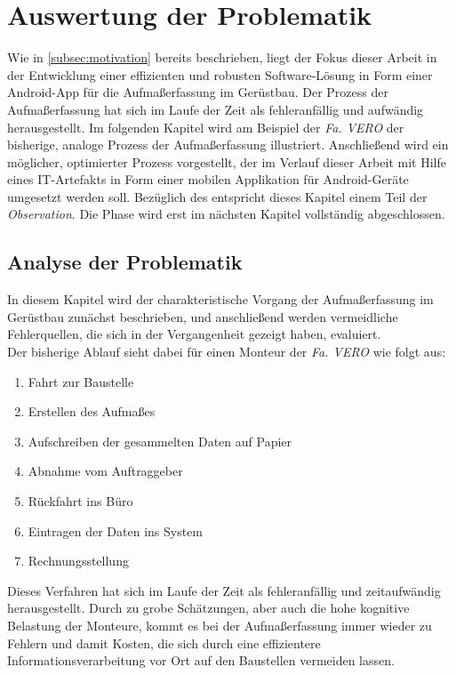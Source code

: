 \chapter{Auswertung der Problematik}\label{chap:problem}
Wie in \autoref{subsec:motivation} bereits beschrieben, liegt der Fokus dieser Arbeit in der Entwicklung einer effizienten und robusten Software-Lösung in Form einer Android-App für die Aufmaßerfassung im Gerüstbau.
Der Prozess der Aufmaßerfassung hat sich im Laufe der Zeit als fehleranfällig und aufwändig herausgestellt.
Im folgenden Kapitel wird am Beispiel der \emph{Fa. VERO} der bisherige, analoge Prozess der Aufmaßerfassung illustriert.
Anschließend wird ein möglicher, optimierter Prozess vorgestellt, der im Verlauf dieser Arbeit mit Hilfe eines IT-Artefakts in Form einer mobilen Applikation für Android-Geräte umgesetzt werden soll.
Bezüglich des \hcdp{} entspricht dieses Kapitel einem Teil der \emph{Observation}.
Die Phase wird erst im nächsten Kapitel vollständig abgeschlossen.

\section{Analyse der Problematik}\label{sec:problem}
In diesem Kapitel wird der charakteristische Vorgang der Aufmaßerfassung im Gerüstbau zunächst beschrieben, und anschließend werden vermeidliche Fehlerquellen, die sich in der Vergangenheit gezeigt haben, evaluiert. \\

Der bisherige Ablauf sieht dabei für einen Monteur der \emph{Fa. VERO} wie folgt aus:
\begin{enumerate}
  \item Fahrt zur Baustelle
  \item Erstellen des Aufmaßes
  \item Aufschreiben der gesammelten Daten auf Papier \label{itm:paper}
  \item Abnahme vom Auftraggeber
  \item Rückfahrt ins Büro
  \item Eintragen der Daten ins System \label{itm:system}
  \item Rechnungsstellung
\end{enumerate}

\noindent
Dieses Verfahren hat sich im Laufe der Zeit als fehleranfällig und zeitaufwändig herausgestellt. 
Durch zu grobe Schätzungen, aber auch die hohe kognitive Belastung der Monteure, kommt es bei der Aufmaßerfassung immer wieder zu Fehlern und damit Kosten, die sich durch eine effizientere Informationsverarbeitung vor Ort auf den Baustellen vermeiden lassen. \\

